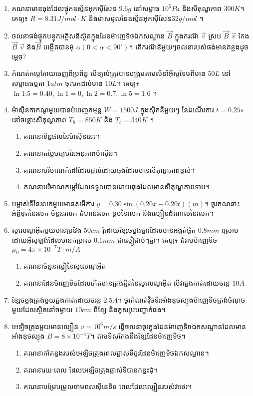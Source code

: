 \documentclass{officialexam}
\begin{document}
	{\maketitle}
	\begin{enumerate}[I]
		\item គណនាមាឌធុងដែលផ្ទុកឧស្ម័នអុកសុីសែន $9.6g$ នៅសម្ពាធ $10^5Pa$ និងសីតុណ្ហភាព $300K$។ គេឲ្យ៖ $R=8.31J/mol\cdot K$ និងម៉ាសម៉ូលនៃឧស្ម័នអុកសុីសែន$32g/mol$ ។
		\item ចលនាផង់ផ្ទុកបន្ទុកអគ្គិសនីស្ថិតក្នុងដែនម៉ាញេទិចឯកសណ្ឋាន $\vec{B}$ ក្នុងករណី $\vec{v}$ ស្រប $\vec{B}$ $\vec{v}$ កែង $\vec{B}$ $\vec{v}$ និង$\vec{B}$ បង្កើតបានមុំ $\alpha\left(0<\alpha<90^\circ\right)$។ តើករណីនីមួយៗចលនារបស់ផង់មានគន្លងដូចម្តេច?
		\item កំណត់កម្តៅភាយចេញពីប្រព័ន្ធ បើខ្យល់ត្រូវបានបង្រួមតាមលំនាំអុីសូទែមពីមាឌ $50L$ នៅសម្ពាធធម្មតា $1atm$ ចុះមកដល់មាឌ $10L$។ គេឲ្យ៖ $\ln1.5=0.40,\ln1=0, \ln2=0.7, \ln5=1.6$ ។
		\item ម៉ាសុីនកាកណូមួយបានបំពេញកម្មន្ត $W=1500J$ ក្នុងសុិកនីមួយៗ នៃដំណើរការ $t=0.25s$ នៅចន្លោះសីតុណ្ហភាព $T_h=850K$ និង $T_c=340K$ ។
		\begin{enumerate}[k]
			\item គណនាទិន្នផលនៃម៉ាសុីននេះ។
			\item គណនាតម្លៃមធ្យមនៃអនុភាពម៉ាសុីន។
			\item គណនាបរិមាណកំដៅដែលផ្ដល់ដោយធុងដែលមានសីតុណ្ហភាពខ្ពស់។
			\item គណនាបរិមាណកម្តៅដែលទទួលបានដោយធុងដែលមានសីតុណ្ហភាពទាប។
		\end{enumerate}
		\item បម្លាស់ទីនៃរលកមួយមានសមីការ $y=0.30\sin\left(0.20x-0.20t\right)(m)$។ ចូរគណនា៖\\
		អំព្លីទុតនៃរលក ចំនួនរលក ជំហានរលក ខួបនៃរលក និងល្បឿនដំណាលនៃរលក។
		\item សូលេណូអុីតមួយមានប្រវែង $50cm$ រុំដោយខ្សែចម្លងឆ្មារដែលមានអង្កត់ផ្ចិត $0.8mm$ ស្រោបដោយអុីសូឡង់ដែលមានកម្រាស់ $0.1mm$ ជាស្ពៀជាប់ៗគ្នា។ គេឲ្យ៖ ជំរាបម៉ាញេទិច $\mu_0=4\pi\times10^{-7}T\cdot m/A$ 
		\begin{enumerate}[k]
			\item គណនាចំនួនស្ពៀនៃសូលេណូអុីត
			\item គណនាដែនម៉ាញេទិចដែលកើតមានត្រង់ផ្ចិតនៃសូលេណូអុីត បើវាឆ្លងកាត់ដោយចរន្ត $10A$ 
		\end{enumerate}
		\item ខ្សែចម្លងត្រង់មួយឆ្លងកាត់ដោយចរន្ត $2.5A$។ ចូរកំណត់វុិចទ័រអាំងឌុចស្យុងម៉ាញេទិចត្រង់ចំណុចមួយដែលស្ថិតនៅចម្ងាយ $10cm$ ពីខ្សែ និងគូសរូបបញ្ជាក់ផង។
		\item អេឡិចត្រុងមួយមានល្បឿន $v=10^{6}m/s$ ធ្វើចលនាចូរក្នុងដែនម៉ាញេទិចឯកសណ្ឋានដែលមានអាំងឌុចស្យុង $B=8\times10^{-4}T$។ តាមទិសកែងនឹងខ្សែដែនម៉ាញេទិច។
		\begin{enumerate}[k]
			\item គណនាកាំគន្លងរបស់អេឡិចត្រុងពេលផ្លាស់ទីចូរដែនម៉ាញេទិចឯកសណ្ឋាន។
			\item គណនារយៈពេល ដែលអេឡិចត្រុងផ្លាស់ទីបានកន្លះជុំ។
			\item គណនាបម្រែបម្រួលថាមពលសុីនេទិច ពេលដែលល្បឿនរបស់វាថេរ។
		\end{enumerate}
	\end{enumerate}
\end{document}
